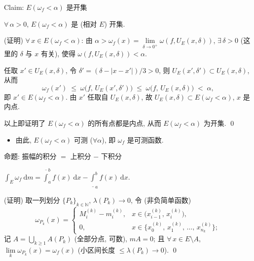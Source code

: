 
\begin{frame}{Claim: $E(\omega_f < \alpha)$ 是开集}

\begin{lem}
$\forall\, \alpha > 0$, $E(\omega_f < \alpha)$ 是 (相对 $E$) 开集.
\end{lem}

\startproof[bg=yellow, fg=red](证明)
$\forall\, x \in E(\omega_f < \alpha)$: 由
$\alpha > \omega_f(x) = \lim\limits_{\delta \to 0^+} \omega(f, U_E(x, \delta))$,
$\exists\, \delta > 0$ (这里的 $\delta$ 与 $x$ 有关), 使得
$\omega(f, U_E(x, \delta)) < \alpha$.

任取 $x' \in U_E(x, \delta)$, 令 $\delta' = (\delta - |x - x'|)/3 > 0$,
则 $U_E(x', \delta') \subset U_E(x, \delta)$, 从而
\[
\omega_f(x') \;\leqslant\; \omega\big( f,\, U_E(x', \delta') \big)
\;\leqslant\; \omega\big( f,\, U_E(x, \delta) \big) \;<\; \alpha ,
\]
即 $x' \in E(\omega_f < \alpha)$. 由 $x'$ 任取自 $U_E(x, \delta)$,
故 $U_E(x, \delta) \subset E(\omega_f < \alpha)$, $x$ 是\alert{内点}.

以上即证明了 $E(\omega_f < \alpha)$ 的所有点都是内点, 从而 $E(\omega_f < \alpha)$ 为开集.
\qed

\pause

\begin{itemize}
\item 由此, $E(\omega_f < \alpha)$ 可测 ($\forall \alpha$), 即 $\omega_f$ 是可测函数.
\end{itemize}

\end{frame}


\begin{frame}{命题: 振幅的积分 $=$ 上积分 $-$ 下积分}

\begin{prop}
$\displaystyle \int_E \omega_f ~ \mathrm{d} m
= \overline{\int}_a^b f(x) ~ \mathrm{d} x - \underline{\int}_a^b f(x) ~ \mathrm{d} x$.
\end{prop}

\startproof[bg=yellow, fg=red](证明)
取一列划分 $\{P_k\}_{k \in \mathbb{N}}$, $\lambda(P_k) \to 0$, 令 (非负简单函数)
\[
\omega_{P_k}(x) =
\begin{cases}
M_i^{(k)} - m_i^{(k)} , & x \in \big( x_{i-1}^{(k)},\, x_i^{(k)} \big), \\
0 , & x \in \big\{ x_0^{(k)},\, x_1^{(k)},\, \dots,\, x_{n_k}^{(k)} \big\} ;
\end{cases}
\]
记 $A = \bigcup_{k \geqslant 1} A(P_k)$ (全部分点, 可数), $mA = 0$;
且 $\forall\, x \in E \setminus A$, $\lim\limits_{k} \omega_{P_k}(x) = \omega_f(x)$
(小区间长度 $\leqslant \lambda(P_k) \to 0$).
\qed

\end{frame}

